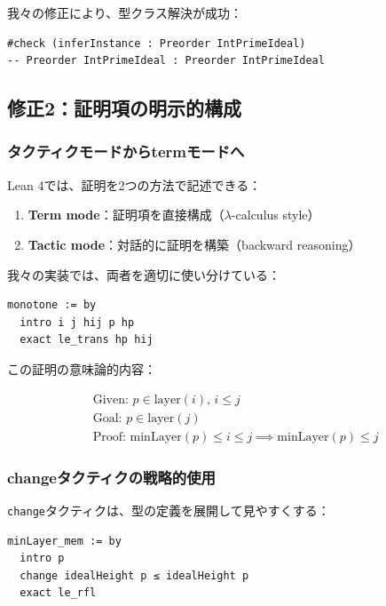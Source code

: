 \documentclass{ltjsarticle}
\begin{document}
我々の修正により、型クラス解決が成功：

\begin{lstlisting}[caption=型クラス解決の成功]
#check (inferInstance : Preorder IntPrimeIdeal)
-- Preorder IntPrimeIdeal : Preorder IntPrimeIdeal
\end{lstlisting}

\subsection{修正2：証明項の明示的構成}

\subsubsection{タクティクモードからtermモードへ}

Lean 4では、証明を2つの方法で記述できる：

\begin{enumerate}
\item \textbf{Term mode}：証明項を直接構成（$\lambda$-calculus style）
\item \textbf{Tactic mode}：対話的に証明を構築（backward reasoning）
\end{enumerate}

我々の実装では、両者を適切に使い分けている：

\begin{lstlisting}[caption=単調性の証明（tactic mode）]
monotone := by
  intro i j hij p hp
  exact le_trans hp hij
\end{lstlisting}

この証明の意味論的内容：

\begin{align*}
&\text{Given: } p \in \text{layer}(i),\, i \le j \\
&\text{Goal: } p \in \text{layer}(j) \\
&\text{Proof: } \text{minLayer}(p) \le i \le j \implies \text{minLayer}(p) \le j
\end{align*}

\subsubsection{changeタクティクの戦略的使用}

\texttt{change}タクティクは、型の定義を展開して見やすくする：

\begin{lstlisting}[caption=changeタクティクの使用例]
minLayer_mem := by
  intro p
  change idealHeight p ≤ idealHeight p
  exact le_rfl
\end{lstlisting}
\end{document}
